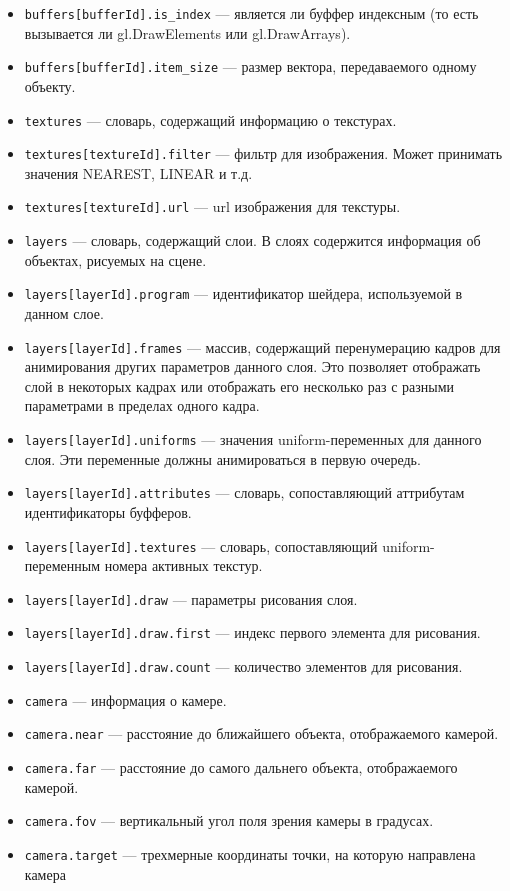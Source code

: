\begin{itemize}
\item \texttt{buffers[bufferId].is\_index} --- является ли буффер индексным (то есть вызывается ли gl.DrawElements или gl.DrawArrays).
\item \texttt{buffers[bufferId].item\_size} --- размер вектора, передаваемого одному объекту.
\item \texttt{textures} --- словарь, содержащий информацию о текстурах.
\item \texttt{textures[textureId].filter} --- фильтр для изображения. Может принимать значения NEAREST, LINEAR и т.д.
\item \texttt{textures[textureId].url} --- url изображения для текстуры.
\item \texttt{layers} --- словарь, содержащий слои. В слоях содержится информация об объектах, рисуемых на сцене.
\item \texttt{layers[layerId].program} --- идентификатор шейдера, используемой в данном слое.
\item \texttt{layers[layerId].frames} --- массив, содержащий перенумерацию кадров для анимирования других параметров данного слоя. Это позволяет отображать слой в некоторых кадрах или отображать его несколько раз с разными параметрами в пределах одного кадра. 
\item \texttt{layers[layerId].uniforms} --- значения uniform-переменных для данного слоя. Эти переменные должны анимироваться в первую очередь. 
\item \texttt{layers[layerId].attributes} --- словарь, сопоставляющий аттрибутам идентификаторы буфферов.
\item \texttt{layers[layerId].textures} --- словарь, сопоставляющий uniform-переменным номера активных текстур.
\item \texttt{layers[layerId].draw} --- параметры рисования слоя.
\item \texttt{layers[layerId].draw.first} --- индекс первого элемента для рисования.
\item \texttt{layers[layerId].draw.count} --- количество элементов для рисования.
\item \texttt{camera} --- информация о камере.
\item \texttt{camera.near} --- расстояние до ближайшего объекта, отображаемого камерой.
\item \texttt{camera.far} --- расстояние до самого дальнего объекта, отображаемого камерой.
\item \texttt{camera.fov} --- вертикальный угол поля зрения камеры в градусах.
\item \texttt{camera.target} --- трехмерные координаты точки, на которую направлена камера

\end{itemize}
